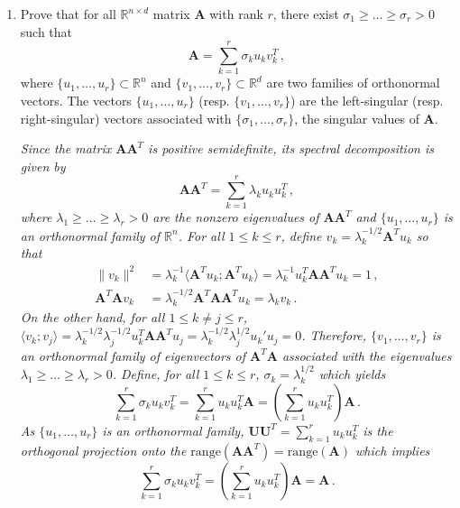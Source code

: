 \documentclass[a4paper,10pt,fleqn]{article}
\newcommand{\eqsp}{\,}
\newcommand{\rset}{\ensuremath{\mathbb{R}}}
\newcommand{\1}{\ensuremath{\mathbbm{1}}}
\newcommand{\bfU}{\mathbf{U}}
\newcommand{\bfA}{\mathbf{A}}
\newcommand{\bfV}{\mathbf{V}}
\begin{document}
\begin{enumerate}
\item Prove that for all $\rset^{n \times d}$ matrix $\bfA$ with rank $r$, there exist $\sigma_1\geqslant \ldots \geqslant \sigma_r>0$ such that
$$
\bfA = \sum_{k=1}^r \sigma_k u_k v^T_k\eqsp,
$$
where $\{u_1,\ldots,u_r\}\subset \rset^n$ and $\{v_1,\ldots,v_r \} \subset \rset^d$ are two families of orthonormal  vectors. The vectors $\{u_1,\ldots,u_r\}$  (resp. $\{v_1,\ldots,v_r\}$) are the left-singular (resp. right-singular) vectors associated with $\{\sigma_1,\ldots,\sigma_r\}$, the singular values of $\bfA$.

\vspace{.2cm}

{\em
Since the matrix $\bfA\bfA^T$ is positive semidefinite, its spectral decomposition is given by
$$
\bfA\bfA^T = \sum_{k=1}^r \lambda_k u_k u^T_k\eqsp,
$$
where $\lambda_1\geqslant \ldots\geqslant \lambda_r>0$ are the nonzero eigenvalues of $\bfA\bfA^T$ and $\{u_1,\ldots,u_r\}$ is an orthonormal family of $\rset^n$. For all $1\leqslant k\leqslant r$, define $v_k = \lambda_k^{-1/2}\bfA^Tu_k$ so that
\begin{align*}
\|v_k\|^2&=\lambda_k^{-1}\langle \bfA^Tu_k;\bfA^Tu_k\rangle = \lambda_k^{-1} u^T_k\bfA\bfA^Tu_k = 1\eqsp, \\
\bfA^T\bfA v_k & = \lambda_k^{-1/2}\bfA^T\bfA \bfA^Tu_k  = \lambda_k v_k\eqsp.
\end{align*}
On the other hand, for all $1\leqslant k\neq j\leqslant r$, $\langle v_k;v_j\rangle = \lambda_k^{-1/2}\lambda_j^{-1/2}u^T_k\bfA\bfA^Tu_j =\lambda_k^{-1/2}\lambda_j^{1/2}u_k'u_j = 0$. Therefore, $\{v_1,\ldots,v_r\}$ is an orthonormal family of eigenvectors of $\bfA^T\bfA$ associated with the eigenvalues $\lambda_1\geqslant \ldots\geqslant \lambda_r>0$.
Define, for all $1\leqslant k\leqslant r$, $\sigma_k = \lambda_k^{1/2}$ which yields
$$
\sum_{k=1}^r \sigma_k u_k v^T_k = \sum_{k=1}^r  u_k u^T_k\bfA = \left(\sum_{k=1}^r  u_k u^T_k\right)\bfA\eqsp.
$$
As $\{u_1,\ldots,u_r\}$ is an orthonormal family, $\bfU\bfU^T = \sum_{k=1}^r u_ku^T_k$ is the orthogonal projection onto the $\mathrm{range}(\bfA\bfA^T) = \mathrm{range}(\bfA)$ which implies
$$
\sum_{k=1}^r \sigma_k u_k v^T_k = \left(\sum_{k=1}^r  u_k u^T_k\right)\bfA = \bfA\eqsp.
$$
}

\end{enumerate}
\end{document}
